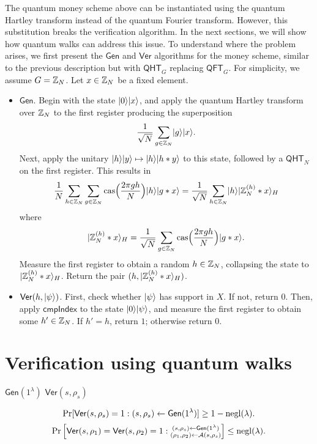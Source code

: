 \documentclass[11pt]{article}
\theoremstyle{definition}
\newcommand{\cas}{\mathrm{cas}}
\newcommand{\qht}{\mathsf{QHT}}
\newcommand{\qft}{\mathsf{QFT}}
\newcommand{\comph}{\mathsf{cmpIndex}}
\newcommand{\gen}{\mathsf{Gen}}
\newcommand{\ver}{\mathsf{Ver}}
\begin{document}
The quantum money scheme above can be instantiated using the quantum Hartley transform instead of the quantum Fourier transform. However, this substitution breaks the verification algorithm. In the next sections, we will show how quantum walks can address this issue. To understand where the problem arises, we first present the $\gen$ and $\ver$ algorithms for the money scheme, similar to the previous description but with $\qht_G$ replacing $\qft_G$. For simplicity, we assume $G = \mathbb{Z}_N$. Let $x \in \mathbb{Z}_N$ be a fixed element.

\begin{itemize}
\item $\gen$. Begin with the state $\lvert0\rangle\lvert x\rangle$, and apply the quantum Hartley transform over $\mathbb{Z}_N$ to the first register producing the superposition
    \[ \frac{1}{\sqrt{N}} \sum_{g \in \mathbb{Z}_N} \lvert g\rangle\lvert x\rangle. \]
    Next, apply the unitary $\lvert h\rangle\lvert y\rangle \mapsto \lvert h\rangle\lvert h * y\rangle$ to this state, followed by a $\qht_N$ on the first register. This results in
    \[ \frac{1}{N} \sum_{h \in \Z_N} \sum_{g \in \Z_N} \cas\Big(\frac{2\pi gh}{N}\Big) \ket{h}\ket{g * x} = \frac{1}{\sqrt{N}} \sum_{h \in \Z_N} \ket{h} \ket{\Z_N^{(h)} * x}_H \]
    where
    \[ \ket{\Z_N^{(h)} * x}_H = \frac{1}{\sqrt{N}} \sum_{g \in \Z_N} \cas\Big(\frac{2\pi gh}{N}\Big) \ket{g * x}. \]
    Measure the first register to obtain a random $h \in \mathbb{Z}_N$, collapsing the state to $\lvert\mathbb{Z}_N^{(h)} * x\rangle_H$. Return the pair $(h, \lvert\mathbb{Z}_N^{(h)} * x\rangle_H)$.

\item $\ver(h, \ket{\psi})$. First, check whether $\lvert\psi\rangle$ has support in $X$. If not, return $0$. Then, apply $\comph$ to the state $\lvert0\rangle \lvert\psi\rangle$, and measure the first register to obtain some $h' \in \mathbb{Z}_N$. If $h' = h$, return $1$; otherwise return $0$.
\end{itemize}

\section*{Verification using quantum walks}






$\gen(1^\lambda)$
$\ver(s, \rho_s)$

\[ \Pr[\ver(s, \rho_s) = 1 : (s, \rho_s) \gets \gen(1^\lambda)] \ge 1 - \negl(\lambda). \]
\[ \Pr\left[ \ver(s, \rho_1) = \ver(s, \rho_2) = 1 : \substack{(s, \rho_s) \gets \gen(1^\lambda) \\ (\rho_1, \rho_2) \gets \mathcal{A}(s, \rho_s)} \right] \le \negl(\lambda). \]
\end{document}
